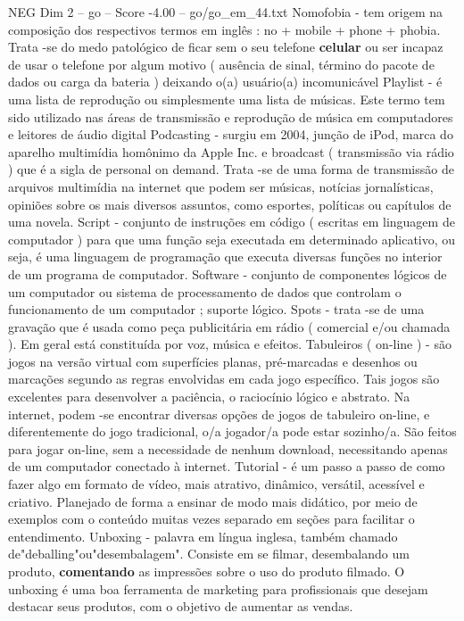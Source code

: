 \begin{textsample}{NEG Dim 2 – go – Score -4.00 – go/go\_em\_44.txt}
Nomofobia - tem origem na composição dos respectivos termos em inglês : no + mobile + phone + phobia.
Trata -se do medo patológico de ficar sem o seu telefone \textbf{celular} ou ser incapaz de usar o telefone por algum motivo ( ausência de sinal, término do pacote de dados ou carga da bateria ) deixando o(a) usuário(a) incomunicável Playlist - é uma lista de reprodução ou simplesmente uma lista de músicas.
Este termo tem sido utilizado nas áreas de transmissão e reprodução de música em computadores e leitores de áudio digital Podcasting - surgiu em 2004, junção de iPod, marca do aparelho multimídia homônimo da Apple Inc. e broadcast ( transmissão via rádio ) que é a sigla de personal on demand.
Trata -se de uma forma de transmissão de arquivos multimídia na internet que podem ser músicas, notícias jornalísticas, opiniões sobre os mais diversos assuntos, como esportes, políticas ou capítulos de uma novela.
Script - conjunto de instruções em código ( escritas em linguagem de computador ) para que uma função seja executada em determinado aplicativo, ou seja, é uma linguagem de programação que executa diversas funções no interior de um programa de computador.
Software - conjunto de componentes lógicos de um computador ou sistema de processamento de dados que controlam o funcionamento de um computador ; suporte lógico.
Spots - trata -se de uma gravação que é usada como peça publicitária em rádio ( comercial e/ou chamada ).
Em geral está constituída por voz, música e efeitos.
Tabuleiros ( on-line ) - são jogos na versão virtual com superfícies planas, pré-marcadas e desenhos ou marcações segundo as regras envolvidas em cada jogo específico.
Tais jogos são excelentes para desenvolver a paciência, o raciocínio lógico e abstrato.
Na internet, podem -se encontrar diversas opções de jogos de tabuleiro on-line, e diferentemente do jogo tradicional, o/a jogador/a pode estar sozinho/a.
São feitos para jogar on-line, sem a necessidade de nenhum download, necessitando apenas de um computador conectado à internet.
Tutorial - é um passo a passo de como fazer algo em formato de vídeo, mais atrativo, dinâmico, versátil, acessível e criativo.
Planejado de forma a ensinar de modo mais didático, por meio de exemplos com o conteúdo muitas vezes separado em seções para facilitar o entendimento.
Unboxing - palavra em língua inglesa, também chamado de"deballing"ou"desembalagem".
Consiste em se filmar, desembalando um produto, \textbf{comentando} as impressões sobre o uso do produto filmado.
O unboxing é uma boa ferramenta de marketing para profissionais que desejam destacar seus produtos, com o objetivo de aumentar as vendas.

\end{textsample}
